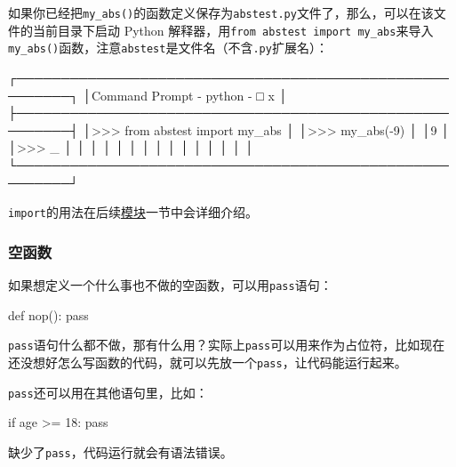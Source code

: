 如果你已经把\texttt{my\_abs()}的函数定义保存为\texttt{abstest.py}文件了，那么，可以在该文件的当前目录下启动
Python
解释器，用\texttt{from\ abstest\ import\ my\_abs}来导入\texttt{my\_abs()}函数，注意\texttt{abstest}是文件名（不含\texttt{.py}扩展名）：

\begin{pythoncode}
┌────────────────────────────────────────────────────────┐
│Command Prompt - python                           - □ x │
├────────────────────────────────────────────────────────┤
│>>> from abstest import my_abs                          │
│>>> my_abs(-9)                                          │
│9                                                       │
│>>> _                                                   │
│                                                        │
│                                                        │
│                                                        │
│                                                        │
│                                                        │
│                                                        │
│                                                        │
└────────────────────────────────────────────────────────┘
\end{pythoncode}

\texttt{import}的用法在后续\href{https://www.liaoxuefeng.com/wiki/1016959663602400/1017454145014176}{模块}一节中会详细介绍。

\hypertarget{ux7a7aux51fdux6570}{%
\subsubsection{空函数}\label{ux7a7aux51fdux6570}}

如果想定义一个什么事也不做的空函数，可以用\texttt{pass}语句：

\begin{pythoncode}
def nop():
    pass
\end{pythoncode}

\texttt{pass}语句什么都不做，那有什么用？实际上\texttt{pass}可以用来作为占位符，比如现在还没想好怎么写函数的代码，就可以先放一个\texttt{pass}，让代码能运行起来。

\texttt{pass}还可以用在其他语句里，比如：

\begin{pythoncode}
if age >= 18:
    pass
\end{pythoncode}

缺少了\texttt{pass}，代码运行就会有语法错误。

